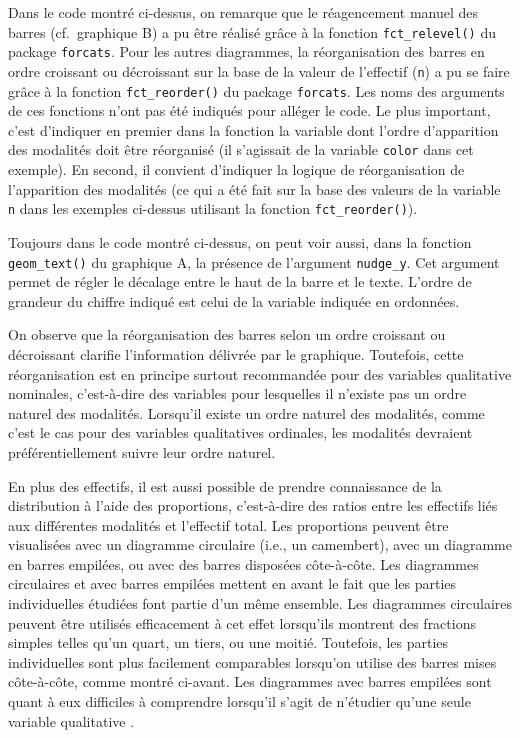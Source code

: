 \documentclass[
  french,
]{book}
\begin{document}
Dans le code montré ci-dessus, on remarque que le réagencement manuel des barres (cf.~graphique B) a pu être réalisé grâce à la fonction \texttt{fct\_relevel()} du package \texttt{forcats}. Pour les autres diagrammes, la réorganisation des barres en ordre croissant ou décroissant sur la base de la valeur de l'effectif (\texttt{n}) a pu se faire grâce à la fonction \texttt{fct\_reorder()} du package \texttt{forcats}. Les noms des arguments de ces fonctions n'ont pas été indiqués pour alléger le code. Le plus important, c'est d'indiquer en premier dans la fonction la variable dont l'ordre d'apparition des modalités doit être réorganisé (il s'agissait de la variable \texttt{color} dans cet exemple). En second, il convient d'indiquer la logique de réorganisation de l'apparition des modalités (ce qui a été fait sur la base des valeurs de la variable \texttt{n} dans les exemples ci-dessus utilisant la fonction \texttt{fct\_reorder()}).

Toujours dans le code montré ci-dessus, on peut voir aussi, dans la fonction \texttt{geom\_text()} du graphique A, la présence de l'argument \texttt{nudge\_y}. Cet argument permet de régler le décalage entre le haut de la barre et le texte. L'ordre de grandeur du chiffre indiqué est celui de la variable indiquée en ordonnées.

On observe que la réorganisation des barres selon un ordre croissant ou décroissant clarifie l'information délivrée par le graphique. Toutefois, cette réorganisation est en principe surtout recommandée pour des variables qualitative nominales, c'est-à-dire des variables pour lesquelles il n'existe pas un ordre naturel des modalités. Lorsqu'il existe un ordre naturel des modalités, comme c'est le cas pour des variables qualitatives ordinales, les modalités devraient préférentiellement suivre leur ordre naturel.

En plus des effectifs, il est aussi possible de prendre connaissance de la distribution à l'aide des proportions, c'est-à-dire des ratios entre les effectifs liés aux différentes modalités et l'effectif total. Les proportions peuvent être visualisées avec un diagramme circulaire (i.e., un camembert), avec un diagramme en barres empilées, ou avec des barres disposées côte-à-côte. Les diagrammes circulaires et avec barres empilées mettent en avant le fait que les parties individuelles étudiées font partie d'un même ensemble. Les diagrammes circulaires peuvent être utilisés efficacement à cet effet lorsqu'ils montrent des fractions simples telles qu'un quart, un tiers, ou une moitié. Toutefois, les parties individuelles sont plus facilement comparables lorsqu'on utilise des barres mises côte-à-côte, comme montré ci-avant. Les diagrammes avec barres empilées sont quant à eux difficiles à comprendre lorsqu'il s'agit de n'étudier qu'une seule variable qualitative \autocite{wilkeFundamentalsDataVisualization2018}.
\end{document}
